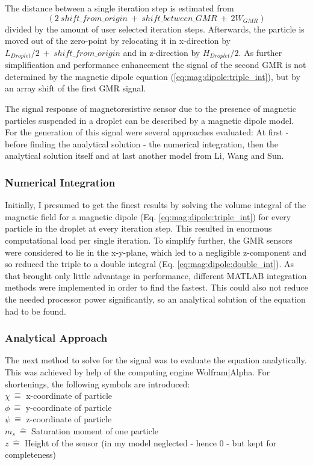 The distance between a single iteration step is estimated from \[(2\ shift\_from\_origin\ +\ shift\_between\_GMR\ +\ 2W_{GMR})\] divided by the amount of user selected iteration steps. Afterwards, the particle is moved out of the zero-point by relocating it in x-direction by $L_{Droplet}/2\ +\ shift\_from\_origin$ and in z-direction by $H_{Droplet}/2$.
As further simplification and performance enhancement the signal of the second GMR is not determined by the magnetic dipole equation (\ref{eq:mag:dipole:triple_int}), but by an array shift of the first GMR signal. 

\bigskip

The signal response of magnetoresistive sensor due to the presence of magnetic particles suspended in a droplet can be described by a magnetic dipole model. For the generation of this signal were several approaches evaluated: At first - before finding the analytical solution - the numerical integration, then the analytical solution itself and at last another model from Li, Wang and Sun.\cite{lit:sim:wang}

\subsubsection{Numerical Integration}
Initially, I presumed to get the finest results by solving the volume integral of the magnetic field for a magnetic dipole (Eq. \ref{eq:mag:dipole:triple_int}) for every particle in the droplet at every iteration step. This resulted in enormous computational load per single iteration. To simplify further, the GMR sensors were considered to lie in the x-y-plane, which led to a negligible z-component and so reduced the triple to a double integral (Eq. \ref{eq:mag:dipole:double_int}). As that brought only little advantage in performance, different MATLAB integration methods were implemented in order to find the fastest. This could also not reduce the needed processor power significantly, so an analytical solution of the equation had to be found.
\newpage
\subsubsection{Analytical Approach}
The next method to solve for the signal was to evaluate the equation analytically. This was achieved by help of the computing engine Wolfram|Alpha.
For shortenings, the following symbols are introduced:\\
$\chi\ \widehat{=}$ x-coordinate of particle\\
$\phi\ \widehat{=}$ y-coordinate of particle\\
$\psi\ \widehat{=}$ z-coordinate of particle\\
$m_s\ \widehat{=}$ Saturation moment of one particle\\
$z \ \widehat{=}$ Height of the sensor (in my model neglected - hence 0 - but kept for completeness)


